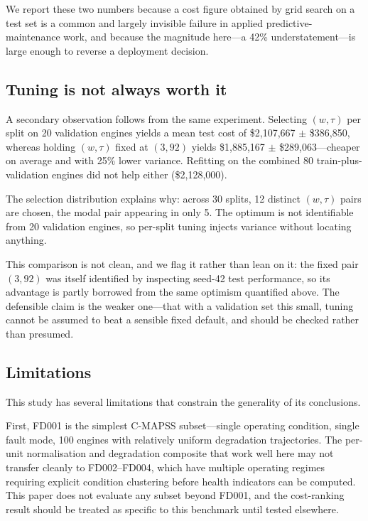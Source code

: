 \documentclass[10pt,twocolumn]{article}
\begin{document}
We report these two numbers because a cost figure obtained by grid search on a test set
is a common and largely invisible failure in applied predictive-maintenance work, and
because the magnitude here---a 42\% understatement---is large enough to reverse a
deployment decision.

\subsection{Tuning is not always worth it}
\label{sec:tuning}

A secondary observation follows from the same experiment. Selecting $(w,\tau)$ per
split on 20 validation engines yields a mean test cost of \$2,107,667 $\pm$ \$386,850,
whereas holding $(w,\tau)$ fixed at $(3,92)$ yields \$1,885,167 $\pm$ \$289,063---cheaper
on average and with 25\% lower variance. Refitting on the combined 80 train-plus-validation
engines did not help either (\$2,128,000).

The selection distribution explains why: across 30 splits, 12 distinct $(w,\tau)$ pairs
are chosen, the modal pair appearing in only 5. The optimum is not identifiable from 20
validation engines, so per-split tuning injects variance without locating anything.

This comparison is not clean, and we flag it rather than lean on it: the fixed pair
$(3,92)$ was itself identified by inspecting seed-42 test performance, so its advantage
is partly borrowed from the same optimism quantified above. The defensible claim is the
weaker one---that with a validation set this small, tuning cannot be assumed to beat a
sensible fixed default, and should be checked rather than presumed.

\subsection{Limitations}

This study has several limitations that constrain the generality of its conclusions.

First, FD001 is the simplest C-MAPSS subset---single operating condition, single fault
mode, 100 engines with relatively uniform degradation trajectories.
The per-unit normalisation and degradation composite that work well here may not
transfer cleanly to FD002--FD004, which have multiple operating regimes requiring
explicit condition clustering before health indicators can be computed.
This paper does not evaluate any subset beyond FD001, and the cost-ranking result
should be treated as specific to this benchmark until tested elsewhere.
\end{document}
